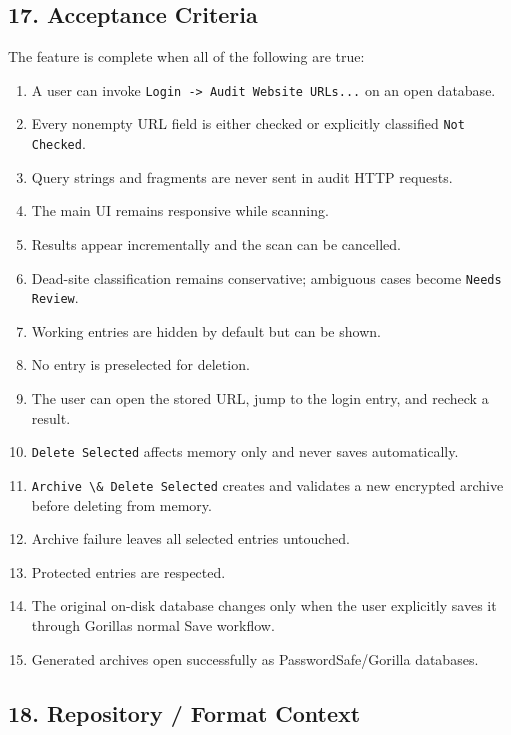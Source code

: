 \documentclass[
  letterpaper,
]{article}
\newcommand{\passthrough}[1]{#1}
\providecommand{\tightlist}{%
  \setlength{\itemsep}{0pt}\setlength{\parskip}{0pt}}
\begin{document}
\subsection{17. Acceptance Criteria}\label{17-acceptance-criteria}

The feature is complete when all of the following are true:

\begin{enumerate}
\def\labelenumi{\arabic{enumi}.}
\tightlist
\item
  A user can invoke \passthrough{\lstinline!Login -> Audit Website URLs...!} on an open database.
\item
  Every nonempty URL field is either checked or explicitly classified \passthrough{\lstinline!Not Checked!}.
\item
  Query strings and fragments are never sent in audit HTTP requests.
\item
  The main UI remains responsive while scanning.
\item
  Results appear incrementally and the scan can be cancelled.
\item
  Dead-site classification remains conservative; ambiguous cases become \passthrough{\lstinline!Needs Review!}.
\item
  Working entries are hidden by default but can be shown.
\item
  No entry is preselected for deletion.
\item
  The user can open the stored URL, jump to the login entry, and recheck a result.
\item
  \passthrough{\lstinline!Delete Selected!} affects memory only and never saves automatically.
\item
  \passthrough{\lstinline!Archive \& Delete Selected!} creates and validates a new encrypted archive before deleting
  from memory.
\item
  Archive failure leaves all selected entries untouched.
\item
  Protected entries are respected.
\item
  The original on-disk database changes only when the user explicitly saves it through Gorilla\textquotesingle s normal
  Save workflow.
\item
  Generated archives open successfully as PasswordSafe/Gorilla databases.
\end{enumerate}

\subsection{18. Repository / Format Context}\label{18-repository--format-context}
\end{document}
